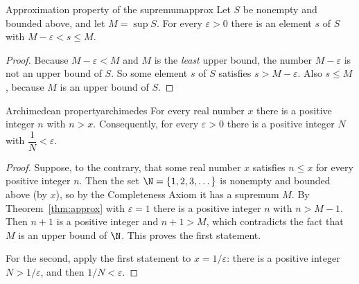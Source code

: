 \documentclass[11pt]{article}
\begin{document}
\begin{thm}{Approximation property of the supremum}{approx}
Let $S$ be nonempty and bounded above, and let $M=\sup S$. For every $\varepsilon>0$ there is an element $s$ of $S$ with $M-\varepsilon<s\le M$.
\end{thm}
\begin{proof}
Because $M-\varepsilon<M$ and $M$ is the \emph{least} upper bound, the number $M-\varepsilon$ is not an upper bound of $S$. So some element $s$ of $S$ satisfies $s>M-\varepsilon$. Also $s\le M$, because $M$ is an upper bound of $S$.
\end{proof}

\begin{thm}{Archimedean property}{archimedes}
For every real number $x$ there is a positive integer $n$ with $n>x$. Consequently, for every $\varepsilon>0$ there is a positive integer $N$ with $\dfrac1N<\varepsilon$.
\end{thm}
\begin{proof}
Suppose, to the contrary, that some real number $x$ satisfies $n\le x$ for every positive integer $n$. Then the set $\N=\{1,2,3,\dots\}$ is nonempty and bounded above (by $x$), so by the Completeness Axiom it has a supremum $M$. By Theorem~\ref{thm:approx} with $\varepsilon=1$ there is a positive integer $n$ with $n>M-1$. Then $n+1$ is a positive integer and $n+1>M$, which contradicts the fact that $M$ is an upper bound of $\N$. This proves the first statement.

For the second, apply the first statement to $x=1/\varepsilon$: there is a positive integer $N>1/\varepsilon$, and then $1/N<\varepsilon$.
\end{proof}
\end{document}
